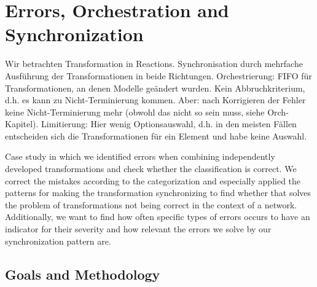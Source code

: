 \section{Errors, Orchestration and Synchronization}


Wir betrachten Transformation in Reactions.
Synchronisation durch mehrfache Ausführung der Transformationen in beide Richtungen.
Orchestrierung: FIFO für Transformationen, an denen Modelle geändert wurden. Kein Abbruchkriterium, d.h. es kann zu Nicht-Terminierung kommen. Aber: nach Korrigieren der Fehler keine Nicht-Terminierung mehr (obwohl das nicht so sein muss, siehe Orch-Kapitel). Limitierung: Hier wenig Optionsauswahl, d.h. in den meisten Fällen entscheiden sich die Transformationen für ein Element und habe keine Auswahl.


Case study in which we identified errors when combining independently developed transformations and check whether the classification is correct. We correct the mistakes according to the categorization and especially applied the patterns for making the transformation synchronizing to find whether that solves the problem of transformations not being correct in the context of a network. Additionally, we want to find how often specific types of errors occurs to have an indicator for their severity and how relevant the errors we solve by our synchronization pattern are.

\subsection{Goals and Methodology}

